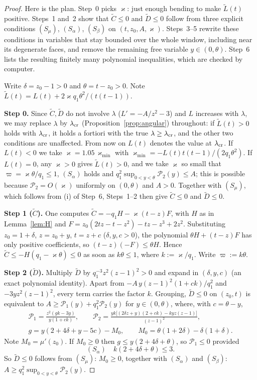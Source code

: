 \documentclass[11pt]{amsart}
\theoremstyle{definition}
\theoremstyle{remark}
\numberwithin{equation}{section}
\begin{document}
\begin{proof}
Here is the plan. Step~0 picks $\varkappa$: just enough bending to make $\tilde L(t)$ positive. Steps~1 and~2 show that
$\tilde C\le0$ and $\tilde D\le0$ follow from three explicit conditions $(S_\mu)$, $(S_\alpha)$, $(S_\beta)$ on
$(t,z_0,A,\varkappa)$. Steps~3--5 rewrite these conditions in variables that stay bounded over the whole window,
including near its degenerate faces, and remove the remaining free variable $y\in(0,\theta)$. Step~6 lists the
resulting finitely many polynomial inequalities, which are checked by computer.

Write $\delta=z_0-1>0$ and $\theta=t-z_0>0$. Note $\tilde L(t)=L(t)+2\varkappa q_1\theta^2/(t(t-1))$.

\smallskip\noindent\textbf{Step 0.} Since $\tilde C,\tilde D$ do not involve $\lambda$ ($L'=-A/z^2-3$) and $L$ increases with $\lambda$, we may
replace $\lambda$ by $\lambda_{\rm cr}$ (Proposition~\ref{prop:angular}) throughout: if $\tilde L(t)>0$ holds with
$\lambda_{\rm cr}$, it holds a fortiori with the true $\lambda\ge\lambda_{\rm cr}$, and the other two conditions are
unaffected. From now on $L(t)$ denotes the value at $\lambda_{\rm cr}$. If $L(t)<0$ we take
$\varkappa=1.05\,\varkappa_{\min}$ with $\varkappa_{\min}=-L(t)t(t-1)/(2q_1\theta^2)$. If $L(t)=0$, any $\varkappa>0$ gives
$\tilde L(t)>0$, and we take $\varkappa$ so small that $\varpi=\varkappa\theta/q_1\le1$, $(S_\alpha)$ holds and
$q_1^2\sup_{0<y<\theta}\mathcal P_2(y)\le A$; this is possible because $\mathcal P_2=O(\varkappa)$ uniformly on $(0,\theta)$ and $A>0$. Together with
$(S_\mu)$, which follows from (i) of Step~6, Steps~1--2 then give $\tilde C\le0$ and $\tilde D\le0$.

\smallskip\noindent\textbf{Step 1 ($\tilde C$).} One computes $\tilde C=-q_1H-\varkappa(t-z)F$, with $H$ as in Lemma~\ref{lem:H} and
$F=z_0(2tz-t-z^2)-tz-z^3+2z^2$. Substituting $z_0=1+\delta$, $z=z_0+y$, $t=z+c$ ($\delta,y,c>0$), the polynomial
$\theta H+(t-z)F$ has only positive coefficients, so $(t-z)(-F)\le\theta H$. Hence
$\tilde C\le-H(q_1-\varkappa\theta)\le0$ as soon as $k\theta\le1$, where $k:=\varkappa/q_1$. Write $\varpi:=k\theta$.

\smallskip\noindent\textbf{Step 2 ($\tilde D$).} Multiply $\tilde D$ by $q_1^{-3}z^2(z-1)^2>0$ and expand in $(\delta,y,c)$ (an exact polynomial
identity). Apart from $-A\,y(z-1)^2(1+ck)/q_1^2$ and $-3yz^2(z-1)^2$, every term carries the factor $k$. Grouping, $\tilde D\le0$
on $(z_0,t)$ is equivalent to $A\ge \mathcal P_1(y)+q_1^2\mathcal P_2(y)$ for $y\in(0,\theta)$, where, with $c=\theta-y$,
\begin{gather*}
\mathcal P_1=\frac{z^2(g k-3y)}{y(1+ck)},\qquad \mathcal P_2=\frac{yk\big[(2\delta z+y)(2+ck)-kyz(z-1)\big]}{(z-1)^2},\\
g=y(2+4\delta+y-5c)-M_0,\qquad M_0=\theta(1+2\delta)-\delta(1+\delta).
\end{gather*}
Note $M_0=\mu'(z_0)$. If $M_0\ge0$ then $g\le y(2+4\delta+\theta)$, so $\mathcal P_1\le0$ provided
\[
(S_\alpha)\quad k(2+4\delta+\theta)\le3 .
\]
So $\tilde D\le0$ follows from $(S_\mu)$: $M_0\ge0$, together with $(S_\alpha)$ and $(S_\beta)$: $A\ge q_1^2\sup_{0<y<\theta}\mathcal P_2(y)$.


\end{proof}
\end{document}
